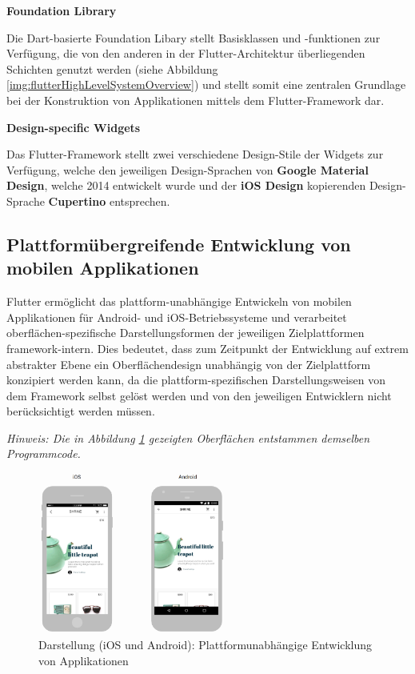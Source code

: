 \documentclass[bibliography=totoc,listof=totoc,BCOR=5mm,DIV=12,oneside]{scrbook}
\begin{document}
\par \bigskip \textbf{Foundation Library}
\par Die Dart-basierte Foundation Libary\citep{FoundationLibary} stellt Basisklassen und -funktionen zur Verfügung, die von den anderen in der Flutter-Architektur überliegenden Schichten genutzt werden (siehe Abbildung \ref{img:flutterHighLevelSystemOverview}) und stellt somit eine zentralen Grundlage bei der Konstruktion von Applikationen mittels dem Flutter-Framework dar.

\par \bigskip \textbf{Design-specific Widgets}
\par Das Flutter-Framework stellt zwei verschiedene Design-Stile der Widgets zur Verfügung, welche den jeweiligen Design-Sprachen von \textbf{Google Material Design}\citep{Mat1}, welche 2014 entwickelt wurde und der \textbf{iOS Design}\citep{iOSDesign} kopierenden Design-Sprache \textbf{Cupertino}\citep{Cup1} entsprechen.

\subsection{Plattformübergreifende Entwicklung von mobilen Applikationen}
\par Flutter ermöglicht das plattform-unabhängige Entwickeln von mobilen Applikationen für Android- und iOS-Betriebssysteme und verarbeitet oberflächen-spezifische Darstellungsformen der jeweiligen Zielplattformen framework-intern. Dies bedeutet, dass zum Zeitpunkt der Entwicklung auf extrem abstrakter Ebene ein Oberflächendesign unabhängig von der Zielplattform konzipiert werden kann, da die plattform-spezifischen Darstellungsweisen von dem Framework selbst gelöst werden und von den jeweiligen Entwicklern nicht berücksichtigt werden müssen. 
\par \bigskip \textit{Hinweis: Die in Abbildung \ref{img:FlutterVisualisierungiOSAndoid} gezeigten Oberflächen entstammen demselben Programmcode.}

\bigskip
\begin{figure}[H]
	\centering
	\includegraphics[width=0.55\textwidth, keepaspectratio]{Bilder/PlattformUebergreifendDesign.png}
	\caption{Darstellung (iOS und Android): Plattformunabhängige Entwicklung von Applikationen \cite[What is Flutter?]{Flu8}}
	\label{img:FlutterVisualisierungiOSAndoid}
\end{figure}
\end{document}
